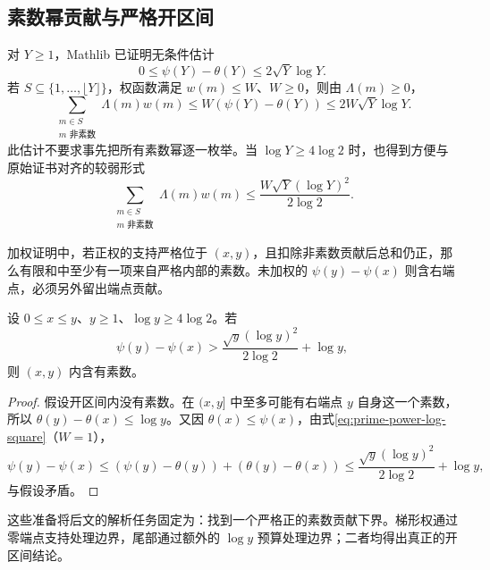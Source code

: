 \subsection{素数幂贡献与严格开区间}
对 $Y\ge1$，Mathlib 已证明无条件估计
\begin{equation}\label{eq:psi-theta-sqrt}
0\le\psi(Y)-\theta(Y)\le2\sqrt Y\log Y.
\end{equation}
若 $S\subseteq\{1,\ldots,\lfloor Y\rfloor\}$，权函数满足 $w(m)\le W$、$W\ge0$，则由 $\Lambda(m)\ge0$，
\[
\sum_{\substack{m\in S\\m\text{ 非素数}}}\Lambda(m)w(m)
\le W(\psi(Y)-\theta(Y))\le2W\sqrt Y\log Y.
\]
此估计不要求事先把所有素数幂逐一枚举。当 $\log Y\ge4\log2$ 时，也得到方便与原始证书对齐的较弱形式
\begin{equation}\label{eq:prime-power-log-square}
\sum_{\substack{m\in S\\m\text{ 非素数}}}\Lambda(m)w(m)
\le\frac{W\sqrt Y(\log Y)^2}{2\log2}.
\end{equation}

加权证明中，若正权的支持严格位于 $(x,y)$，且扣除非素数贡献后总和仍正，那么有限和中至少有一项来自严格内部的素数。未加权的 $\psi(y)-\psi(x)$ 则含右端点，必须另外留出端点贡献。

\begin{lemma}[未加权的严格端点提取]\label{pre:endpoint}
设 $0\le x\le y$、$y\ge1$、$\log y\ge4\log2$。若
\[
\psi(y)-\psi(x)>
\frac{\sqrt y(\log y)^2}{2\log2}+\log y,
\]
则 $(x,y)$ 内含有素数。
\end{lemma}
\begin{proof}
假设开区间内没有素数。在 $(x,y]$ 中至多可能有右端点 $y$ 自身这一个素数，所以 $\theta(y)-\theta(x)\le\log y$。又因 $\theta(x)\le\psi(x)$，由式\eqref{eq:prime-power-log-square}（$W=1$），
\[
\psi(y)-\psi(x)
\le(\psi(y)-\theta(y))+(\theta(y)-\theta(x))
\le\frac{\sqrt y(\log y)^2}{2\log2}+\log y,
\]
与假设矛盾。
\end{proof}

这些准备将后文的解析任务固定为：找到一个严格正的素数贡献下界。梯形权通过零端点支持处理边界，尾部通过额外的 $\log y$ 预算处理边界；二者均得出真正的开区间结论。
